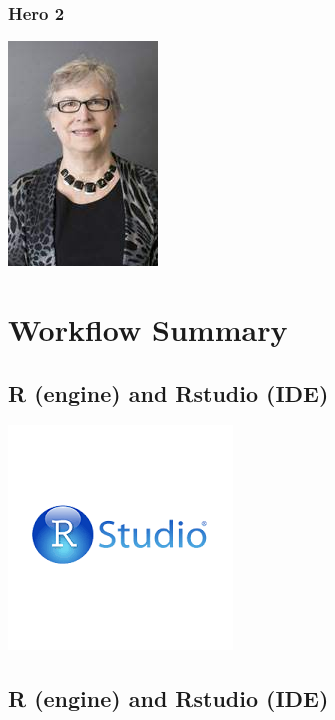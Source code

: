 \documentclass[
]{book}
\begin{document}
\hypertarget{hero-2}{%
\subsection{Hero 2}\label{hero-2}}

\begin{center}\includegraphics{_images/wilma} \end{center}

\hypertarget{workflow-summary}{%
\chapter{Workflow Summary}\label{workflow-summary}}

\hypertarget{r-engine-and-rstudio-ide}{%
\section{R (engine) and Rstudio (IDE)}\label{r-engine-and-rstudio-ide}}

\begin{center}\includegraphics{_images/rstudio} \end{center}

\hypertarget{r-engine-and-rstudio-ide-1}{%
\section{R (engine) and Rstudio (IDE)}\label{r-engine-and-rstudio-ide-1}}
\end{document}
